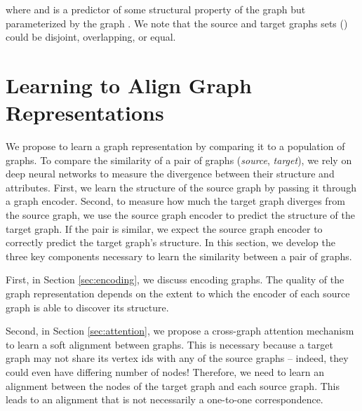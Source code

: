 \documentclass[sigconf]{acmart}
\begin{document}
where  and  is a predictor of some structural property of the graph  but parameterized by the graph .
We note that the source and target graphs sets () could be disjoint, overlapping, or equal.

\begin{comment}
\subsection{Representation Properties}
We seek to learn graph representations through a process which has the following desirable
characteristics:

\begin{itemize}
    \item Unsupervised - the distance between graphs should be computable without side information
    \item Unaware (General)
    \item Self-aligning
    \item Can account for attribute information (both node and edge) attributes.
\end{itemize}

We detail the method that we design for this below.
\end{comment}

\section{Learning to Align Graph Representations}
\label{sec:aligngraphs}
We propose to learn a graph representation by comparing it to a population of graphs.
To compare the similarity of a pair of graphs (\emph{source}, \emph{target}), we rely on deep neural networks to measure the divergence between their structure and attributes.
First, we learn the structure of the source graph by passing it through a graph encoder.
Second, to measure how much the target graph diverges from the source graph,
we use the source graph encoder to predict the structure of the target graph.
If the pair is similar, we expect the source graph encoder to correctly predict the target graph's structure.
In this section, we develop the three key components necessary to learn the similarity between a pair of graphs.

First, in Section \ref{sec:encoding}, we discuss encoding graphs. 
The quality of the graph representation depends on the extent to which the encoder of each source graph is able to discover its structure.

Second, in Section \ref{sec:attention}, we propose a cross-graph attention mechanism to learn a soft alignment between graphs.
This is necessary because a target graph may not share its vertex ids with any of the source graphs -- indeed, they could even have differing number of nodes!
Therefore, we need to learn an alignment between the nodes of the target graph and each source graph.
This leads to an alignment that is not necessarily a one-to-one correspondence.
\end{document}
